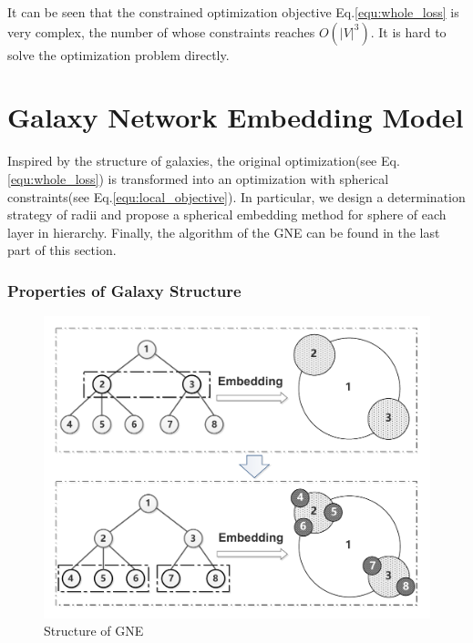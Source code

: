 \documentclass{article}
\theoremstyle{definition}
\begin{document}
	It can be seen that the constrained optimization objective Eq.\ref{equ:whole_loss} is very complex, the number of whose constraints reaches $O (|V|^3) $. It is hard to solve the optimization problem directly.
	
	\section{Galaxy Network Embedding Model}
	\label{sec:model}
	Inspired by the structure of galaxies, the original optimization(see Eq.\ref{equ:whole_loss}) is transformed into an optimization with spherical constraints(see Eq.\ref{equ:local_objective}). In particular, we design a determination strategy of radii and propose a spherical embedding method for sphere of each layer in hierarchy. Finally, the algorithm of the GNE can be found in the last part of this section.  
	 \subsubsection{Properties of Galaxy Structure}
	 \begin{figure}
	 	\centering
		\includegraphics[width=0.6\linewidth]{figure/Structure.pdf}
		\caption{Structure of GNE}
		\label{fig:structure}
	 \end{figure}
	 
\end{document}
